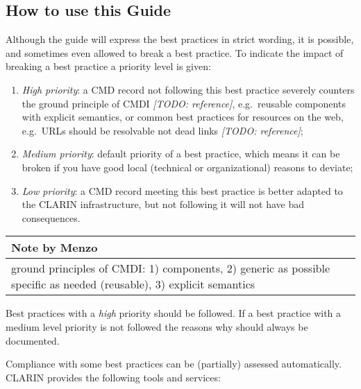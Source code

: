 \documentclass[]{article}
\date{}
\providecommand{\tightlist}{%
  \setlength{\itemsep}{0pt}\setlength{\parskip}{0pt}}
\begin{document}
\subsection{How to use this Guide}\label{scope}

Although the guide will express the best practices in strict wording, it
is possible, and sometimes even allowed to break a best practice. To
indicate the impact of breaking a best practice a priority level is
given:

\begin{enumerate}
\def\labelenumi{\arabic{enumi}.}
\tightlist
\item
  \emph{High priority}: a CMD record not following this best practice
  severely counters the ground principle of CMDI \emph{{[}TODO:
  reference{]}}, e.g.~reusable components with explicit semantics, or
  common best practices for resources on the web, e.g.~URLs should be
  resolvable not dead links \emph{{[}TODO: reference{]}};
\item
  \emph{Medium priority}: default priority of a best practice, which
  means it can be broken if you have good local (technical or
  organizational) reasons to deviate;
\item
  \emph{Low priority}: a CMD record meeting this best practice is better
  adapted to the CLARIN infrastructure, but not following it will not
  have bad consequences.
\end{enumerate}

\begin{longtable}[c]{@{}l@{}}
\toprule
\begin{minipage}[b]{0.07\columnwidth}\raggedright\strut
Note by Menzo
\strut\end{minipage}\tabularnewline
\midrule
\endhead
\begin{minipage}[t]{0.07\columnwidth}\raggedright\strut
ground principles of CMDI: 1) components, 2) generic as possible
specific as needed (reusable), 3) explicit semantics
\strut\end{minipage}\tabularnewline
\bottomrule
\end{longtable}

Best practices with a \emph{high} priority should be followed. If a best
practice with a medium level priority is not followed the reasons why
should always be documented.

Compliance with some best practices can be (partially) assessed
automatically. CLARIN provides the following tools and services:
\end{document}
